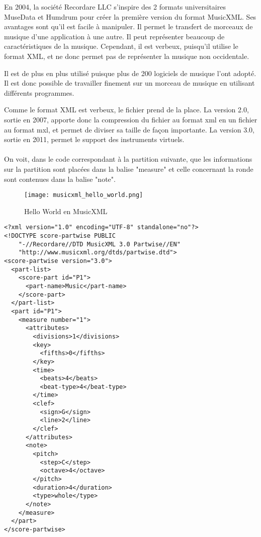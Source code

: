 En 2004, la société Recordare LLC s’inspire des 2 formats universitaires MuseData et Humdrum pour créer la première version du format MusicXML. Ses avantages sont qu’il est facile à manipuler. Il permet le transfert de morceaux de musique d’une application à une autre. Il peut représenter beaucoup de caractéristiques de la musique. Cependant, il est verbeux, puisqu'il utilise le format XML, et ne donc permet pas de représenter la musique non occidentale.

Il est de plus en plus utilisé puisque plus de 200 logiciels de musique l’ont adopté. Il est donc possible de travailler finement sur un morceau de musique en utilisant différents programmes.

Comme le format XML est verbeux, le fichier prend de la place. La version 2.0, sortie en 2007, apporte donc la compression du fichier au format xml en un fichier au format mxl, et permet de diviser sa taille de façon importante. La version 3.0, sortie en 2011, permet le support des instruments virtuels.\\~\\

On voit, dans le code correspondant à la partition suivante, que les informations sur la partition sont placées dans la balise "measure" et celle concernant la ronde sont contenues dans la balise "note".

\begin{figure}[!h] %
\centering
\texttt{[image: musicxml\_hello\_world.png]}\\[1cm]
\caption{Hello World en MusicXML}
\label{Hello World en MusicXML}
\end{figure}

\newpage

\begin{lstlisting}[caption=Document XML d'un Hello World en MusicXML, label=ruleml]
<?xml version="1.0" encoding="UTF-8" standalone="no"?>
<!DOCTYPE score-partwise PUBLIC
    "-//Recordare//DTD MusicXML 3.0 Partwise//EN"
    "http://www.musicxml.org/dtds/partwise.dtd">
<score-partwise version="3.0">
  <part-list>
    <score-part id="P1">
      <part-name>Music</part-name>
    </score-part>
  </part-list>
  <part id="P1">
    <measure number="1">
      <attributes>
        <divisions>1</divisions>
        <key>
          <fifths>0</fifths>
        </key>
        <time>
          <beats>4</beats>
          <beat-type>4</beat-type>
        </time>
        <clef>
          <sign>G</sign>
          <line>2</line>
        </clef>
      </attributes>
      <note>
        <pitch>
          <step>C</step>
          <octave>4</octave>
        </pitch>
        <duration>4</duration>
        <type>whole</type>
      </note>
    </measure>
  </part>
</score-partwise>
\end{lstlisting}



